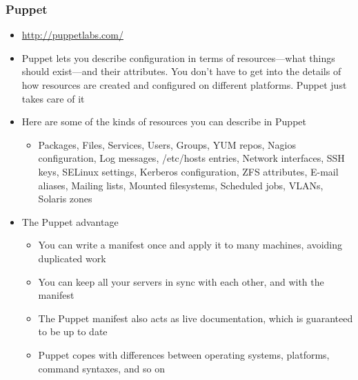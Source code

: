 \documentclass{beamer}
\begin{document}
\begin{frame}
\frametitle{Puppet}
\begin{itemize}
\item \url{http://puppetlabs.com/}
\item Puppet lets you describe configuration in terms of resources—what things should exist—and
their attributes. You don't have to get into the details of how resources are created and
configured on different platforms. Puppet just takes care of it
\item Here are some of the kinds of resources you can describe in Puppet
\begin{itemize}
\item Packages, Files, Services, Users, Groups, YUM repos, Nagios configuration, Log messages, /etc/hosts entries, Network interfaces, SSH keys,
SELinux settings, Kerberos configuration, ZFS attributes, E-mail aliases, Mailing lists, Mounted filesystems,
Scheduled jobs, VLANs, Solaris zones
\end{itemize}
\item The Puppet advantage
\begin{itemize}
\item You can write a manifest once and apply it to many machines, avoiding
duplicated work
\item You can keep all your servers in sync with each other, and with the manifest
\item The Puppet manifest also acts as live documentation, which is guaranteed to
be up to date
\item Puppet copes with differences between operating systems, platforms, command
syntaxes, and so on
\end{itemize}
\end{itemize}
\end{frame}
\end{document}
